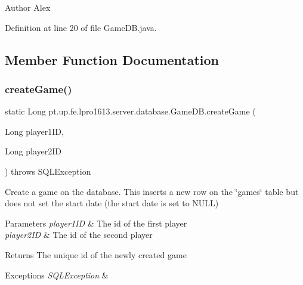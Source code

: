 \begin{DoxyAuthor}{Author}
Alex 
\end{DoxyAuthor}


Definition at line 20 of file Game\+D\+B.\+java.



\subsection{Member Function Documentation}
\hypertarget{classpt_1_1up_1_1fe_1_1lpro1613_1_1server_1_1database_1_1_game_d_b_af4ec546a91795e5394379cfaaaf073cb}{}\label{classpt_1_1up_1_1fe_1_1lpro1613_1_1server_1_1database_1_1_game_d_b_af4ec546a91795e5394379cfaaaf073cb} 
\subsubsection{\texorpdfstring{create\+Game()}{createGame()}}
{\footnotesize\ttfamily static Long pt.\+up.\+fe.\+lpro1613.\+server.\+database.\+Game\+D\+B.\+create\+Game (\begin{DoxyParamCaption}\item[{Long}]{player1\+ID,  }\item[{Long}]{player2\+ID }\end{DoxyParamCaption}) throws S\+Q\+L\+Exception\hspace{0.3cm}{\ttfamily [static]}}

Create a game on the database. This inserts a new row on the \char`\"{}games\char`\"{} table but does not set the start date (the start date is set to N\+U\+LL)


\begin{DoxyParams}{Parameters}
{\em player1\+ID} & The id of the first player \\
\hline
{\em player2\+ID} & The id of the second player \\
\hline
\end{DoxyParams}
\begin{DoxyReturn}{Returns}
The unique id of the newly created game 
\end{DoxyReturn}

\begin{DoxyExceptions}{Exceptions}
{\em S\+Q\+L\+Exception} & \\
\hline
\end{DoxyExceptions}


